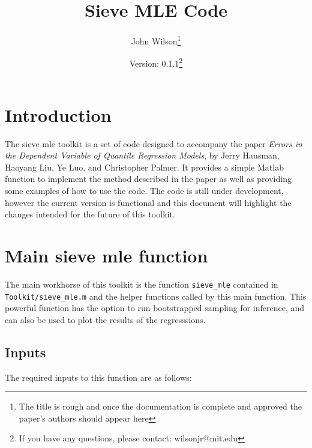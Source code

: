 \documentclass[12pt]{article}
\title{Sieve MLE Code}
\author{John Wilson\footnote{The title is rough and once the documentation is complete and approved the paper's authors should appear here}}
\date{Version: 0.1.1\footnote{If you have any questions, please contact: wilsonjr@mit.edu}}
\begin{document}
\nocite{*}
\maketitle

\tableofcontents

\newpage

\section{Introduction}

The sieve mle toolkit is a set of code designed to accompany the paper \textit{Errors in the Dependent Variable of Quantile Regression Models}, by Jerry Hausman, Haoyang Liu, Ye Luo, and Christopher Palmer. It provides a simple Matlab function to implement the method described in the paper as well as providing some examples of how to use the code. The code is still under development, however the current version is functional and this document will highlight the changes intended for the future of this toolkit.

\section{Main sieve mle function}

The main workhorse of this toolkit is the function \lstinline{sieve_mle} contained in \lstinline{Toolkit/sieve_mle.m} and the helper functions called by this main function. This powerful function has the option to run bootstrapped sampling for inference, and can also be used to plot the results of the regresssions.

\subsection{Inputs}

The required inputs to this function are as follows:
\end{document}
